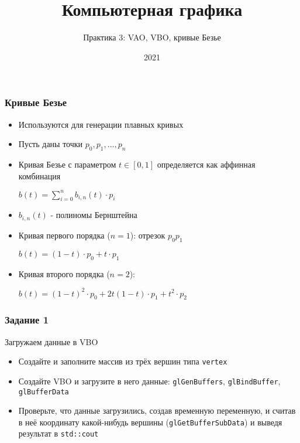 \documentclass{beamer}
\title{Компьютерная графика}
\subtitle{Практика 3: VAO, VBO, кривые Безье}
\date{2021}
\begin{document}
\frame{\titlepage}

\begin{frame}[fragile]
\frametitle{Кривые Безье}
\begin{itemize}
\item Используются для генерации плавных кривых
\item Пусть даны точки \begin{math}p_0, p_1, \dots, p_n\end{math}
\item Кривая Безье с параметром \begin{math}t \in [0, 1]\end{math} определяется как аффинная комбинация

\begin{math}
b(t) = \sum\limits_{i=0}^n b_{i,n}(t) \cdot p_i
\end{math}

\item \begin{math}b_{i,n}(t)\end{math} - полиномы Бернштейна
\pause
\item Кривая первого порядка (\begin{math}n=1\end{math}): отрезок \begin{math}p_0 p_1\end{math}

\begin{math}b(t) = (1-t)\cdot p_0 + t \cdot p_1\end{math}
\pause
\item Кривая второго порядка (\begin{math}n=2\end{math}):

\begin{math}b(t) = (1-t)^2 \cdot p_0 + 2t(1-t) \cdot p_1 + t^2 \cdot p_2\end{math}
\end{itemize}
\end{frame}

\begin{frame}[fragile]
\frametitle{Задание 1}
Загружаем данные в VBO
\begin{itemize}
\item Создайте и заполните массив из трёх вершин типа \verb|vertex|
\pause
\item Создайте VBO и загрузите в него данные: \verb|glGenBuffers|, \verb|glBindBuffer|, \verb|glBufferData|
\pause
\item Проверьте, что данные загрузились, создав временную переменную, и считав в неё координату какой-нибудь вершины (\verb|glGetBufferSubData|) и выведя результат в \verb|std::cout|
\end{itemize}
\end{frame}
\end{document}
